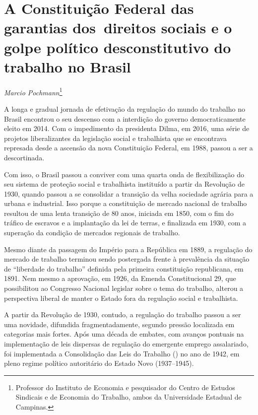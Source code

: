 \chapter*{A Constituição Federal das garantias dos~direitos sociais e o
golpe político desconstitutivo do trabalho no Brasil}


\begin{flushright}
\emph{Marcio Pochmann}\footnote{Professor do Instituto de Economia e
  pesquisador do Centro de Estudos Sindicais e de Economia do Trabalho,
  ambos da Universidade Estadual de Campinas.}
\end{flushright}

A longa e gradual jornada de efetivação da regulação do mundo do
trabalho no Brasil encontrou o seu descenso com a interdição do governo
democraticamente eleito em 2014. Com o impedimento da presidenta Dilma,
em 2016, uma série de projetos liberalizantes da legislação social e
trabalhista que se encontrava represada desde a ascensão da nova
Constituição Federal, em 1988, passou a ser a descortinada.

Com isso, o Brasil passou a conviver com uma quarta onda de
flexibilização do seu sistema de proteção social e trabalhista
instituído a partir da Revolução de 1930, quando passou a se consolidar
a transição da velha sociedade agrária para a urbana e industrial. Isso
porque a constituição de mercado nacional de trabalho resultou de uma
lenta transição de 80 anos, iniciada em 1850, com o fim do tráfico de
escravos e a implantação da lei de terras, e finalizada em 1930, com a
superação da condição de mercados regionais de trabalho.

Mesmo diante da passagem do Império para a República em 1889, a
regulação do mercado de trabalho terminou sendo postergada frente à
prevalência da situação de ``liberdade do trabalho'' definida pela
primeira constituição republicana, em 1891. Nem mesmo a aprovação, em
1926, da Emenda Constitucional 29, que possibilitou ao Congresso
Nacional legislar sobre o tema do trabalho, alterou a perspectiva
liberal de manter o Estado fora da regulação social e trabalhista.

A partir da Revolução de 1930, contudo, a regulação do trabalho passou a
ser uma novidade, difundida fragmentadamente, segundo pressão localizada
em categorias mais fortes. Após uma década de embates, com avanços
pontuais na implementação de leis dispersas de regulação do emergente
emprego assalariado, foi implementada a Consolidação das Leis do
Trabalho () no ano de 1942, em pleno regime político autoritário do
Estado Novo (1937--1945).

